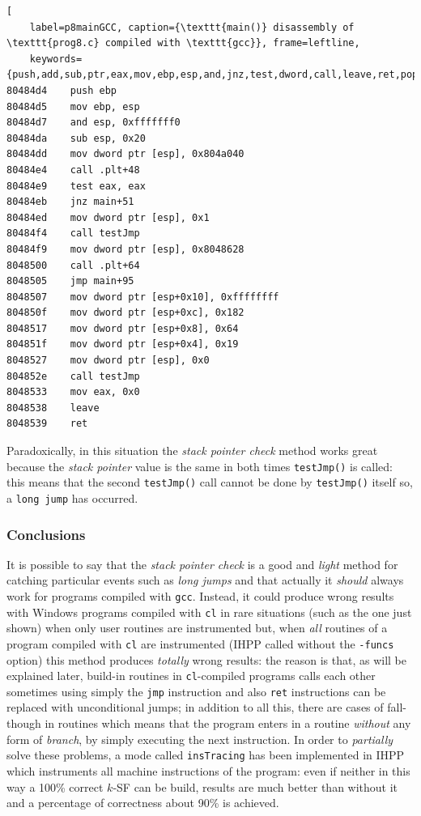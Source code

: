 \documentclass[a4paper,10pt]{report}
\begin{document}
\begin{lstlisting}[ 
	label=p8mainGCC, caption={\texttt{main()} disassembly of \texttt{prog8.c} compiled with \texttt{gcc}}, frame=leftline, 
	keywords={push,add,sub,ptr,eax,mov,ebp,esp,and,jnz,test,dword,call,leave,ret,pop,jmp}]
80484d4    push ebp
80484d5    mov ebp, esp
80484d7    and esp, 0xfffffff0
80484da    sub esp, 0x20
80484dd    mov dword ptr [esp], 0x804a040
80484e4    call .plt+48
80484e9    test eax, eax
80484eb    jnz main+51
80484ed    mov dword ptr [esp], 0x1
80484f4    call testJmp
80484f9    mov dword ptr [esp], 0x8048628
8048500    call .plt+64
8048505    jmp main+95
8048507    mov dword ptr [esp+0x10], 0xffffffff
804850f    mov dword ptr [esp+0xc], 0x182
8048517    mov dword ptr [esp+0x8], 0x64
804851f    mov dword ptr [esp+0x4], 0x19
8048527    mov dword ptr [esp], 0x0
804852e    call testJmp
8048533    mov eax, 0x0
8048538    leave 
8048539    ret 
\end{lstlisting}

\noindent
Paradoxically, in this situation the \emph{stack pointer check} method works
great because the \emph{stack pointer} value is the same in both times \verb|testJmp()|
is called: this means that the second \verb|testJmp()| call cannot be done by \verb|testJmp()| itself so, a \verb|long jump| has occurred.

\subsubsection{Conclusions}
It is possible to say that the \emph{stack pointer check} is
a good and \emph{light} method for catching particular events such as \emph{long jumps}
and that actually it \emph{should} always work for programs compiled with \verb|gcc|.
Instead, it could produce wrong results with Windows programs compiled with \verb|cl|
in rare situations (such as the one just shown) when only user routines are instrumented but, when \emph{all} routines of a program compiled with \verb|cl| are instrumented (IHPP called without the \verb|-funcs| option) this method produces \emph{totally} wrong results:
the reason is that, as will be explained later, build-in routines in \verb|cl|-compiled programs calls each other sometimes using simply the \verb|jmp| instruction and also 
\verb|ret| instructions can be replaced with unconditional jumps; in addition to
all this, there are cases of fall-though in routines which means that the program 
enters in a routine \emph{without} any form of \emph{branch}, by simply executing 
the next instruction. In order to \emph{partially} solve these problems, 
a mode called \verb|insTracing| has been implemented in IHPP which instruments all machine instructions of the program: even if neither in this way a 100\% correct $k$-SF 
can be build, results are much better than without it and a percentage of correctness 
about 90\% is achieved.    
\end{document}
